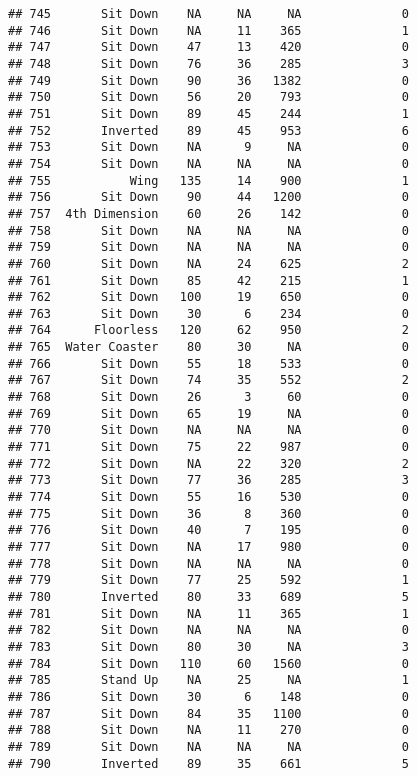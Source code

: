 \documentclass[
]{article}
\begin{document}
\begin{verbatim}
## 745       Sit Down    NA     NA     NA              0
## 746       Sit Down    NA     11    365              1
## 747       Sit Down    47     13    420              0
## 748       Sit Down    76     36    285              3
## 749       Sit Down    90     36   1382              0
## 750       Sit Down    56     20    793              0
## 751       Sit Down    89     45    244              1
## 752       Inverted    89     45    953              6
## 753       Sit Down    NA      9     NA              0
## 754       Sit Down    NA     NA     NA              0
## 755           Wing   135     14    900              1
## 756       Sit Down    90     44   1200              0
## 757  4th Dimension    60     26    142              0
## 758       Sit Down    NA     NA     NA              0
## 759       Sit Down    NA     NA     NA              0
## 760       Sit Down    NA     24    625              2
## 761       Sit Down    85     42    215              1
## 762       Sit Down   100     19    650              0
## 763       Sit Down    30      6    234              0
## 764      Floorless   120     62    950              2
## 765  Water Coaster    80     30     NA              0
## 766       Sit Down    55     18    533              0
## 767       Sit Down    74     35    552              2
## 768       Sit Down    26      3     60              0
## 769       Sit Down    65     19     NA              0
## 770       Sit Down    NA     NA     NA              0
## 771       Sit Down    75     22    987              0
## 772       Sit Down    NA     22    320              2
## 773       Sit Down    77     36    285              3
## 774       Sit Down    55     16    530              0
## 775       Sit Down    36      8    360              0
## 776       Sit Down    40      7    195              0
## 777       Sit Down    NA     17    980              0
## 778       Sit Down    NA     NA     NA              0
## 779       Sit Down    77     25    592              1
## 780       Inverted    80     33    689              5
## 781       Sit Down    NA     11    365              1
## 782       Sit Down    NA     NA     NA              0
## 783       Sit Down    80     30     NA              3
## 784       Sit Down   110     60   1560              0
## 785       Stand Up    NA     25     NA              1
## 786       Sit Down    30      6    148              0
## 787       Sit Down    84     35   1100              0
## 788       Sit Down    NA     11    270              0
## 789       Sit Down    NA     NA     NA              0
## 790       Inverted    89     35    661              5

\end{verbatim}
\end{document}
